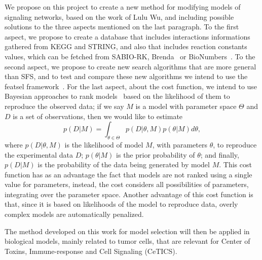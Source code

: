 We propose on this project to create a new method for modifying 
models of signaling networks, based on the work of Lulu Wu, and 
including possible solutions to the three aspects mentioned on the last 
paragraph. To the first aspect, we propose to create a database that 
includes interactions informations gathered from KEGG and STRING, and 
also that includes reaction constants values, which can be fetched from
SABIO-RK, Brenda~\cite{Schomburg2004} or BioNumbers~\cite{Milo2009}. To
the second aspect, we propose to create new search algorithms that are
more general than SFS, and to test and compare these new algorithms we
intend to use the featsel framework~\cite{REIS2017193}. For the last 
aspect, about the cost function, we intend to use Bayesian approaches to
rank models~\cite{Vyshemirsky2007} based on the likelihood of them to 
reproduce the observed data; if we say $M$ is a model with parameter 
space $\Theta$ and $D$ is a set of observations, then we would like to 
estimate 
\begin{equation*}
p (D|M) = \int_{\theta \in \Theta} p (D | \theta, M)p(\theta | M)d\theta, 
\end{equation*}
where $p (D|\theta, M)$ is the likelihood of model $M$, with parameters
$\theta$, to reproduce the experimental data $D$; $p(\theta|M)$ is the
prior probability of $\theta$; and finally, $p (D|M)$ is the probability 
of the data being generated by model $M$. This cost function has as an 
advantage the fact that models are not ranked using a single value for 
parameters, instead, the cost considers all possibilities of parameters, 
integrating over the parameter space. Another advantage of this cost 
function is that, since it is based on likelihoods of the model to 
reproduce data, overly complex models are automatically penalized.

The method developed on this work for model selection will then be 
applied in biological models, mainly related to tumor cells, that are
relevant for Center of Toxins, Immune-response and Cell Signaling 
(CeTICS).



